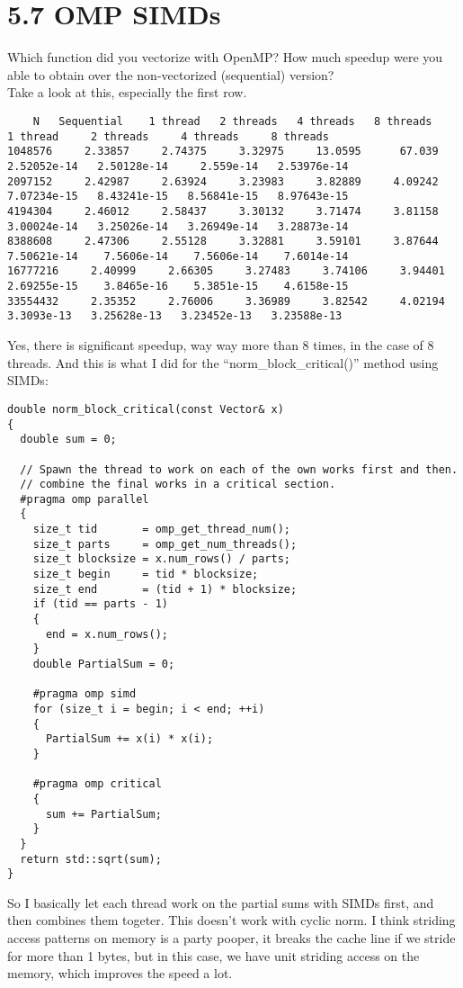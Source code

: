 \documentclass[]{article}
\begin{document}
\section*{5.7 OMP SIMDs}
    Which function did you vectorize with OpenMP? How much speedup were you able to obtain over the non-vectorized (sequential) version?
    \\[1.1em]
    Take a look at this, especially the first row. 
    \begin{lstlisting}
    N   Sequential    1 thread   2 threads   4 threads   8 threads      1 thread     2 threads     4 threads     8 threads
1048576     2.33857     2.74375     3.32975     13.0595      67.039   2.52052e-14   2.50128e-14     2.559e-14   2.53976e-14
2097152     2.42987     2.63924     3.23983     3.82889     4.09242   7.07234e-15   8.43241e-15   8.56841e-15   8.97643e-15
4194304     2.46012     2.58437     3.30132     3.71474     3.81158   3.00024e-14   3.25026e-14   3.26949e-14   3.28873e-14
8388608     2.47306     2.55128     3.32881     3.59101     3.87644   7.50621e-14    7.5606e-14    7.5606e-14    7.6014e-14
16777216     2.40999     2.66305     3.27483     3.74106     3.94401   2.69255e-15    3.8465e-16    5.3851e-15    4.6158e-15
33554432     2.35352     2.76006     3.36989     3.82542     4.02194    3.3093e-13   3.25628e-13   3.23452e-13   3.23588e-13
    \end{lstlisting}
    Yes, there is significant speedup, way way more than 8 times, in the case of 8 threads. And this is what I did for the ``norm\_block\_critical()'' method using SIMDs: 
    \begin{lstlisting}
double norm_block_critical(const Vector& x) 
{
  double sum = 0;

  // Spawn the thread to work on each of the own works first and then. 
  // combine the final works in a critical section. 
  #pragma omp parallel
  {
    size_t tid       = omp_get_thread_num();
    size_t parts     = omp_get_num_threads();
    size_t blocksize = x.num_rows() / parts;
    size_t begin     = tid * blocksize;
    size_t end       = (tid + 1) * blocksize;
    if (tid == parts - 1) 
    {
      end = x.num_rows();
    }
    double PartialSum = 0;
    
    #pragma omp simd
    for (size_t i = begin; i < end; ++i) 
    {
      PartialSum += x(i) * x(i);
    }
    
    #pragma omp critical
    {
      sum += PartialSum;
    }
  }
  return std::sqrt(sum);
}
    \end{lstlisting}
    So I basically let each thread work on the partial sums with SIMDs first, and then combines them togeter. This doesn't work with cyclic norm. I think striding access patterns on memory is a party pooper, it breaks the cache line if we stride for more than 1 bytes, but in this case, we have unit striding access on the memory, which improves the speed a lot. 
\end{document}
